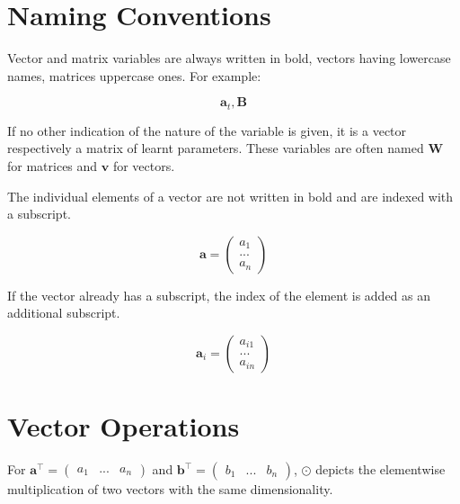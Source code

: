 \section{Naming Conventions}

Vector and matrix variables are always written in bold, vectors having lowercase names, matrices uppercase ones. For example:

\begin{equation*}
  \mathbf{a}_t, \mathbf{B}
\end{equation*}

If no other indication of the nature of the variable is given, it is a vector respectively a matrix of learnt parameters. These variables are often named \(\mathbf{W}\) for matrices and \(\mathbf{v}\) for vectors.

\bigskip

The individual elements of a vector are not written in bold and are indexed with a subscript.

\begin{equation*}
  \mathbf{a} = \begin{pmatrix} a_1 \\ ... \\ a_n \end{pmatrix}
\end{equation*}

If the vector already has a subscript, the index of the element is added as an additional subscript.

\begin{equation*}
  \mathbf{a}_i = \begin{pmatrix} a_{i1} \\ ... \\ a_{in} \end{pmatrix}
\end{equation*}

\pagebreak

\section{Vector Operations}

For \(\mathbf{a}^\intercal = \begin{pmatrix} a_1 & ... & a_n \end{pmatrix}\) and \(\mathbf{b}^\intercal = \begin{pmatrix} b_1 & ... & b_n \end{pmatrix}\), \(\odot\) depicts the elementwise multiplication of two vectors with the same dimensionality.

